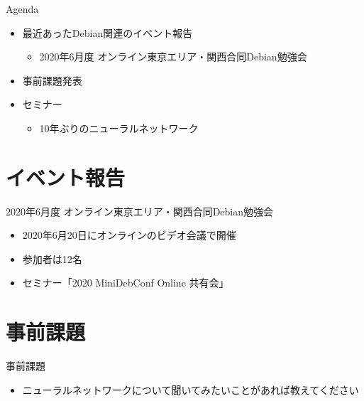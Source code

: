 \begin{frame}{Agenda}
 \begin{minipage}[t]{0.45\hsize}
  \begin{itemize}
  \item 最近あったDebian関連のイベント報告
    \begin{itemize}
    \item 2020年6月度 オンライン東京エリア・関西合同Debian勉強会
    \end{itemize}
  \item 事前課題発表
  \end{itemize}
 \end{minipage}
 \begin{minipage}[t]{0.45\hsize}
   \begin{itemize}
   \item セミナー
     \begin{itemize}
     \item 10年ぶりのニューラルネットワーク
     \end{itemize}
  \end{itemize}
 \end{minipage}
\end{frame}

\section{イベント報告}

\begin{frame}{2020年6月度 オンライン東京エリア・関西合同Debian勉強会}
\begin{itemize}
\item 2020年6月20日にオンラインのビデオ会議で開催
\item 参加者は12名
\item セミナー「2020 MiniDebConf Online 共有会」
\end{itemize}
\end{frame}


\section{事前課題}


\begin{frame}{事前課題}
  \begin{itemize}
  \item ニューラルネットワークについて聞いてみたいことがあれば教えてください
  \end{itemize}
\end{frame}

